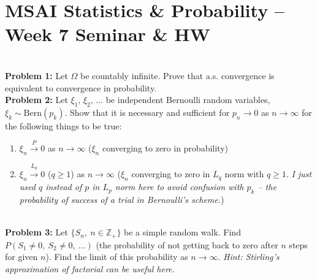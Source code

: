 \documentclass[12pt]{article}
\numberwithin{equation}{section}
\begin{document}
\section*{MSAI Statistics \& Probability – Week 7 Seminar \& HW}\\

\textbf{Problem 1:} Let $\Omega$ be countably infinite. Prove that a.s. convergence is equivalent to convergence in probability.
\\

\textbf{Problem 2:} Let $\xi_1,\,\xi_2,\,\dots$ be independent Bernoulli random variables, $\xi_k\sim\textrm{Bern}(p_k).$ Show that it is necessary and sufficient for $p_n\rightarrow0$ as $n\rightarrow\infty$ for the following things to be true:
\begin{enumerate}
    \item $\xi_n\overset{P}{\rightarrow}0$ as $n\rightarrow\infty$ ($\xi_n$ converging to zero in probability)
    \item $\xi_n\overset{L_q}{\rightarrow}0$ ($q\geq1$) as $n\rightarrow\infty$ ($\xi_n$ converging to zero in $L_q$ norm with $q\geq1$. \textit{I just used $q$ instead of $p$ in $L_p$ norm here to avoid confusion with $p_k$ – the probability of success of a trial in Bernoulli's scheme.})
\end{enumerate}
\\

\textbf{Problem 3:} Let $\{S_n,~n\in\mathbb{Z}_+\}$ be a simple random walk. Find $P(S_1\neq0,~S_2\neq0,~\dots)$ (the probability of not getting back to zero after $n$ steps for given $n$). Find the limit of this probability as $n\rightarrow\infty.$ \textit{Hint: Stirling's approximation of factorial can be useful here.}
\end{document}
